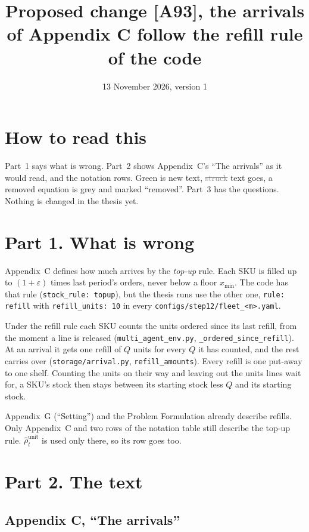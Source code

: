 \documentclass[11pt,a4paper]{article}
\title{Proposed change [A93], the arrivals of Appendix C follow the refill rule of the code}
\date{13 November 2026, version 1}
\newcommand{\new}[1]{\textcolor{newc}{#1}}
\newcommand{\old}[1]{\textcolor{gray}{\sout{#1}}}
\begin{document}
\maketitle

\section*{How to read this}
Part~1 says what is wrong. Part~2 shows Appendix~C's ``The arrivals'' as it would read, and the
notation rows. \new{Green} is new text, \old{struck} text goes, a removed equation is grey and marked
``removed''. Part~3 has the questions. Nothing is changed in the thesis yet.

\section*{Part 1. What is wrong}

Appendix~C defines how much arrives by the \emph{top-up} rule. Each SKU is filled up to
$(1+\varepsilon)$ times last period's orders, never below a floor $x_{\min}$. The code has that rule
(\texttt{stock\_rule: topup}), but the thesis runs use the other one, \texttt{rule: refill} with
\texttt{refill\_units: 10} in every \texttt{configs/step12/fleet\_<m>.yaml}.

Under the refill rule each SKU counts the units ordered since its last refill, from the moment a line is
released (\texttt{multi\_agent\_env.py}, \texttt{\_ordered\_since\_refill}). At an arrival it gets one
refill of $Q$ units for every $Q$ it has counted, and the rest carries over
(\texttt{storage/arrival.py}, \texttt{refill\_amounts}). Every refill is one put-away to one shelf.
Counting the units on their way and leaving out the units lines wait for, a SKU's stock then stays
between its starting stock less $Q$ and its starting stock.

Appendix~G (``Setting'') and the Problem Formulation already describe refills. Only Appendix~C and
two rows of the notation table still describe the top-up rule. $\hat\rho^{\mathrm{unit}}_t$ is used
only there, so its row goes too.

\section*{Part 2. The text}

\subsection*{Appendix C, ``The arrivals''}
\end{document}
